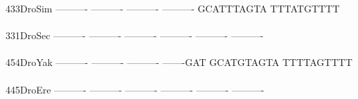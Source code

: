 \documentclass[11pt,twoside,reqno,a4paper]{article}
\begin{document}
{433\hspace*{2\charwidth}DroSim	----------	----------	----------	----------	GCATTTAGTA	TTTATGTTTT	\\
\hspace*{5\charwidth}\hspace*{7\charwidth}\hspace*{1\charwidth}\hspace*{1\charwidth}\hspace*{1\charwidth}\hspace*{1\charwidth}\hspace*{1\charwidth}\hspace*{1\charwidth}\\
331\hspace*{2\charwidth}DroSec	----------	----------	----------	----------	----------	----------	\\
\hspace*{5\charwidth}\hspace*{7\charwidth}\hspace*{1\charwidth}\hspace*{1\charwidth}\hspace*{1\charwidth}\hspace*{1\charwidth}\hspace*{1\charwidth}\hspace*{1\charwidth}\\
454\hspace*{2\charwidth}DroYak	----------	----------	----------	-------GAT	GCATGTAGTA	TTTTAGTTTT	\\
\hspace*{5\charwidth}\hspace*{7\charwidth}\hspace*{1\charwidth}\hspace*{1\charwidth}\hspace*{1\charwidth}\hspace*{1\charwidth}\hspace*{1\charwidth}\hspace*{1\charwidth}\\
445\hspace*{2\charwidth}DroEre	----------	----------	----------	----------	----------	----------	\\
\hspace*{5\charwidth}\hspace*{7\charwidth}\hspace*{1\charwidth}\hspace*{1\charwidth}\hspace*{1\charwidth}\hspace*{1\charwidth}\hspace*{1\charwidth}\hspace*{1\charwidth}\\
}
\end{document}
